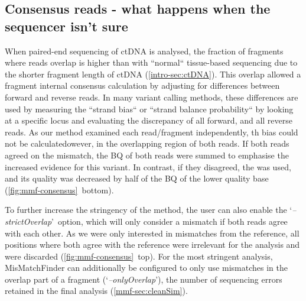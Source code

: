 \subsection[Consensus reads]{Consensus reads - what happens when the sequencer isn't sure}
\label{mmf-sec:consensus}

When paired-end sequencing of ctDNA is analysed, the fraction of fragments where reads overlap is higher than with ``normal`` tissue-based sequencing due to the shorter fragment length of ctDNA (\autoref{intro-sec:ctDNA}). This overlap allowed a fragment internal consensus calculation by adjusting for differences between forward and reverse reads. In many variant calling methods, these differences are used by measuring the ``strand bias`` \cite{Guo2012, Saunders2012, GATKTeam2019} or ``strand balance probability`` \cite{Garrison2012} by looking at a specific locus and evaluating the discrepancy of all forward, and all reverse reads. As our method examined each read/fragment independently, th bias could not be calculatedowever, in the overlapping region of both reads. If both reads agreed on the mismatch, the BQ of both reads were summed to emphasise the increased evidence for this variant. In contrast, if they disagreed, the  was used, and its quality was decreased by half of the BQ of the lower quality base (\autoref{fig:mmf-consensus}~bottom). \cite{Magoc2011}\cite{Zhang2013} 

To further increase the stringency of the method, the user can also enable the \lq\emph{--strictOverlap}\rq\ option, which will only consider a mismatch if both reads agree with each other. As we were only interested in mismatches from the reference, all positions where both agree with the reference were irrelevant for the analysis and were discarded (\autoref{fig:mmf-consensus}~top). For the most stringent analysis, MisMatchFinder can additionally be configured to only use mismatches in the overlap part of a fragment (\lq\emph{--onlyOverlap}\rq),  the number of sequencing errors retained in the final analysis (\autoref{mmf-sec:cleanSim}).

